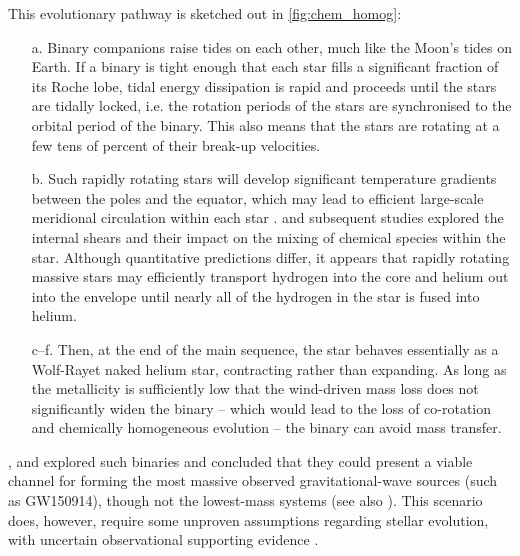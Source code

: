 \documentclass[review]{elsarticle}
\begin{document}
This evolutionary pathway is sketched out in \autoref{fig:chem_homog}:
\begin{itemize}
\item[a.] Binary companions raise tides on each other, much like the Moon's tides on Earth.  If a binary is tight enough that each star fills a significant fraction of its Roche lobe, tidal energy dissipation is rapid and proceeds until the stars are tidally locked, i.e. the rotation periods of the stars are synchronised to the orbital period of the binary. This also means that the stars are rotating at a few tens of percent of their break-up velocities.  
\item[b.] Such rapidly rotating stars will develop significant temperature gradients between the poles and the equator, which may lead to efficient large-scale meridional circulation within each star \citep{Eddington:1925,Sweet:1950}.  \citet{EndalSofia:1978} and subsequent studies \citep[e.g.,][]{Heger:2000,MaederMeynet:2000,Yoon:2006,Szecsi:2015} explored the internal shears and their impact on the mixing of chemical species within the star.  Although quantitative predictions differ, it appears that rapidly rotating massive stars may efficiently transport hydrogen into the core and helium out into the envelope until nearly all of the hydrogen in the star is fused into helium.  
\item[c--f.] Then, at the end of the main sequence, the star behaves essentially as a Wolf-Rayet naked helium star, contracting rather than expanding. As long as the metallicity is sufficiently low that the wind-driven mass loss does not significantly widen the binary -- which would lead to the loss of co-rotation and chemically homogeneous evolution \citep{deMink:2009} -- the binary can avoid mass transfer.  
\end{itemize}

\citet{MandeldeMink:2016,deMinkMandel:2016}, and \citet{Marchant:2016} explored such binaries and concluded that they could present a viable channel for forming the most massive observed gravitational-wave sources (such as GW150914), though not the lowest-mass systems (see also \cite{duBoisson:2020,Riley:2020}).  This scenario does, however, require some unproven assumptions regarding stellar evolution, with uncertain observational supporting evidence \citep{Almeida:2015, AbdulMasih:2021}.
\end{document}

